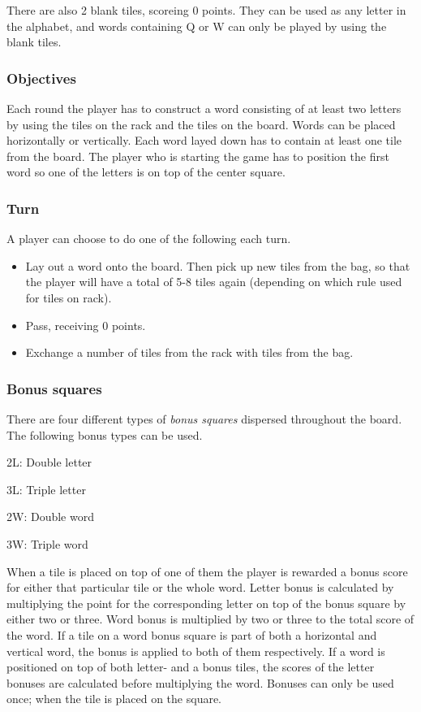 \documentclass[a4paper, 12pt]{report}
\begin{document}
There are also 2 blank tiles, scoreing 0 points. They can be used as any letter in the alphabet, and words containing Q or W can only be played by using the blank tiles.

\subsubsection{Objectives}
Each round the player has to construct a word consisting of at least two letters by using the tiles on the rack and the tiles on the board. Words can be placed horizontally or vertically. Each word layed down has to contain at least one tile from the board. The player who is starting the game has to position the first word so one of the letters is on top of the center square.

\subsubsection{Turn}
A player can choose to do one of the following each turn.
\begin{itemize}
\item Lay out a word onto the board. Then pick up new tiles from the bag, so that the player will have a total of 5-8 tiles again (depending on which rule used for tiles on rack).
\item Pass, receiving 0 points.
\item Exchange a number of tiles from the rack with tiles from the bag.
\end{itemize}

\subsubsection{Bonus squares}
There are four different types of \emph{bonus squares} dispersed throughout the board. The following bonus types can be used.

\begin{description}
\item{2L:} Double letter
\item{3L:} Triple letter
\item{2W:} Double word
\item{3W:} Triple word
\end{description}

When a tile is placed on top of one of them the player is rewarded a bonus score for either that particular tile or the whole word. Letter bonus is calculated by multiplying the point for the corresponding letter on top of the bonus square by either two or three. Word bonus is multiplied by two or three to the total score of the word. If a tile on a word bonus square is part of both a horizontal and vertical word, the bonus is applied to both of them respectively. If a word is positioned on top of both letter- and a bonus tiles, the scores of the letter bonuses are calculated before multiplying the word. Bonuses can only be used once; when the tile is placed on the square.
\end{document}
